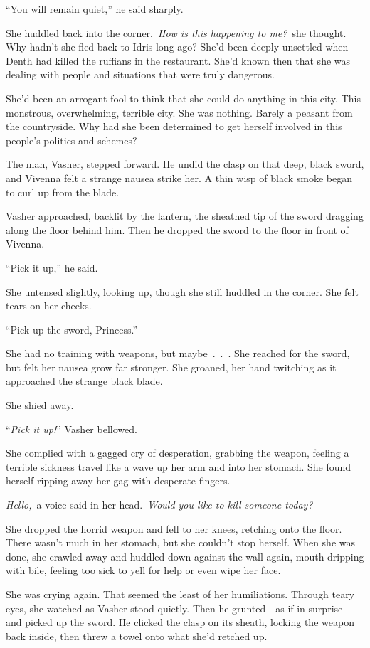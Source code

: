 “You will remain quiet,” he said sharply.

She huddled back into the corner.~\textit{How is this happening to me?}~she thought. Why hadn’t she fled back to Idris long ago? She’d been deeply unsettled when Denth had killed the ruffians in the restaurant. She’d known then that she was dealing with people and situations that were truly dangerous.

She’d been an arrogant fool to think that she could do anything in this city. This monstrous, overwhelming, terrible city. She was nothing. Barely a peasant from the countryside. Why had she been determined to get herself involved in this people’s politics and schemes?

The man, Vasher, stepped forward. He undid the clasp on that deep, black sword, and Vivenna felt a strange nausea strike her. A thin wisp of black smoke began to curl up from the blade.

Vasher approached, backlit by the lantern, the sheathed tip of the sword dragging along the floor behind him. Then he dropped the sword to the floor in front of Vivenna.

“Pick it up,” he said.

She untensed slightly, looking up, though she still huddled in the corner. She felt tears on her cheeks.

“Pick up the sword, Princess.”

She had no training with weapons, but maybe~.~.~. She reached for the sword, but felt her nausea grow far stronger. She groaned, her hand twitching as it approached the strange black blade.

She shied away.

“\textit{Pick it up!}” Vasher bellowed.

She complied with a gagged cry of desperation, grabbing the weapon, feeling a terrible sickness travel like a wave up her arm and into her stomach. She found herself ripping away her gag with desperate fingers.

\textit{Hello,}~a voice said in her head.~\textit{Would you like to kill someone today?}

She dropped the horrid weapon and fell to her knees, retching onto the floor. There wasn’t much in her stomach, but she couldn’t stop herself. When she was done, she crawled away and huddled down against the wall again, mouth dripping with bile, feeling too sick to yell for help or even wipe her face.

She was crying again. That seemed the least of her humiliations. Through teary eyes, she watched as Vasher stood quietly. Then he grunted—as if in surprise—and picked up the sword. He clicked the clasp on its sheath, locking the weapon back inside, then threw a towel onto what she’d retched up.


